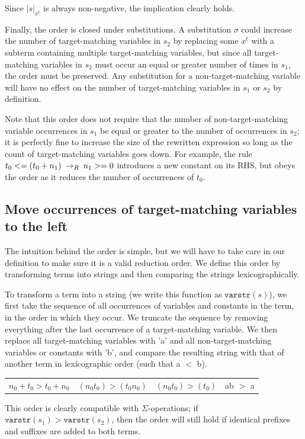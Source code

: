 Since $|s|_{x^t}$ is always non-negative, the implication clearly holds.

Finally, the order is closed under substitutions. A substitution $\sigma$ could increase the number of target-matching variables in $s_2$ by replacing some $x^t$ with a subterm containing multiple target-matching variables, but since all target-matching variables in $s_2$ must occur an equal or greater number of times in $s_1$, the order must be preserved. Any substitution for a non-target-matching variable will have no effect on the number of target-matching variables in $s_1$ or $s_2$ by definition. 

Note that this order does not require that the number of non-target-matching variable occurrences in $s_1$ be equal or greater to the number of occurrences in $s_2$; it is perfectly fine to increase the size of the rewritten expression so long as the count of target-matching variables goes down. For example, the rule $t_0 <= (t_0 + n_1) \:\rightarrow_{R}\: n_1 >= 0$ introduces a new constant on its RHS, but obeys the order as it reduces the number of occurrences of $t_0$.

\subsection{Move occurrences of target-matching variables to the left}

The intuition behind the order is simple, but we will have to take care in our definition to make sure it is a valid reduction order. We define this order by transforming terms into strings and then comparing the strings lexicographically.

To transform a term into a string (we write this function as $\texttt{varstr}(s)$), we first take the sequence of all occurrences of variables and constants in the term, in the order in which they occur. We truncate the sequence by removing everything after the last occurrence of a target-matching variable. We then replace all target-matching variables with 'a' and all non-target-matching variables or constants with 'b', and compare the resulting string with that of another term in lexicographic order (such that a $<$ b).

\begin{tabular}{l|l|l|l}
\centering
$n_0 + t_0 > t_0 + n_0$ & $(n_0 t_0) > (t_0 n_0)$ & $(n_0 t_0) > (t_0)$ & ab $>$ a \\
\end{tabular}

This order is clearly compatible with $\Sigma$-operations; if $\texttt{varstr}(s_1) > \texttt{varstr}(s_2)$, then the order will still hold if identical prefixes and suffixes are added to both terms. 

